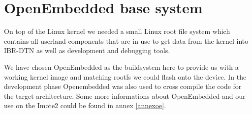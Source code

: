 \section{OpenEmbedded base system}
On top of the Linux kernel we needed a small Linux root file system which
contains all userland components that are in use to get data from the kernel
into IBR-DTN as well as development and debugging tools.

We have chosen OpenEmbedded as the buildsystem here to provide us with a working
kernel image and matching rootfs we could flash onto the device. In the
development phase Openembedded was also used to cross compile the code for the
target architecture. Some more informations about OpenEmbedded and our use on the
Imote2 could be found in annex \ref{annexoe}.

